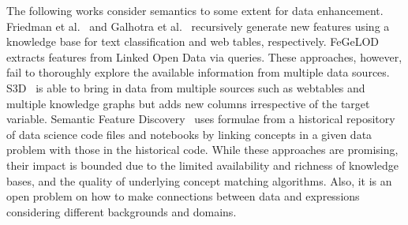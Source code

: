 \documentclass[sigconf, nonacm]{acmart}
\begin{document}


The following works consider semantics to some extent for data enhancement. Friedman et al.~\cite{friedman2018recursive} and Galhotra et al.~\cite{galhotra2019automated} recursively generate new features using a knowledge base for text classification and web tables, respectively. FeGeLOD~\cite{PH} extracts features from Linked Open Data via queries. These approaches, however, fail to thoroughly explore the available information from multiple data sources. S3D~\cite{s3d} is able to bring in data from multiple sources such as webtables and multiple knowledge graphs but adds new columns irrespective of the target variable. Semantic Feature Discovery~\cite{sfd} uses formulae from a historical repository of data science code files and notebooks by linking concepts in a given data problem with those in the historical code. 
While these approaches are promising, their impact is bounded due to the limited availability and richness of knowledge bases, and the quality of underlying concept matching algorithms. Also, it is an open problem on how to make connections between data and expressions considering different backgrounds and domains. 
\end{document}
